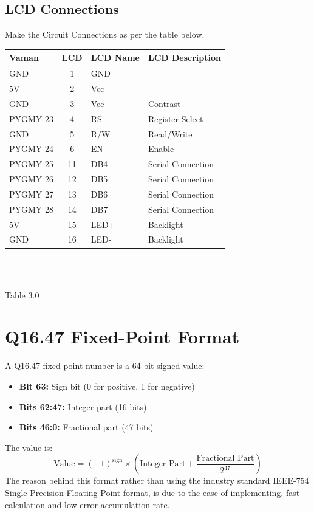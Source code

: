 \documentclass[conference]{IEEEtran}
\begin{document}
\begin{FlushLeft}
\subsection{LCD Connections}
\raggedright
Make the Circuit Connections as per the table below.\\
\vspace{0.25cm}
\centering
    \begin{tabular}{|l|c|l|l|}
        \hline
        \textbf{Vaman} & \textbf{LCD} & \textbf{LCD Name} & \textbf{LCD Description} \\
        \hline
        GND & 1 & GND & \\
        \hline
        5V & 2 & Vcc & \\
        \hline
        GND & 3 & Vee & Contrast \\
        \hline
        PYGMY 23 & 4 & RS & Register Select \\
        \hline
        GND & 5 & R/W & Read/Write \\
        \hline
        PYGMY 24 & 6 & EN & Enable \\
        \hline
        PYGMY 25 & 11 & DB4 & Serial Connection \\
        \hline
        PYGMY 26 & 12 & DB5 & Serial Connection \\
        \hline
        PYGMY 27 & 13 & DB6 & Serial Connection \\
        \hline
        PYGMY 28 & 14 & DB7 & Serial Connection \\
        \hline
        5V & 15 & LED+ & Backlight \\
        \hline
        GND & 16 & LED- & Backlight \\
        \hline
    \end{tabular}
\\
\
\centerline{Table 3.0}



\section{Q16.47 Fixed-Point Format}
A Q16.47 fixed-point number is a 64-bit signed value:
\begin{itemize}
    \item \textbf{Bit 63:} Sign bit (0 for positive, 1 for negative)
    \item \textbf{Bits 62:47:} Integer part (16 bits)
    \item \textbf{Bits 46:0:} Fractional part (47 bits)
\end{itemize}
The value is:
\begin{equation}
    \text{Value} = (-1)^{\text{sign}} \times \left(\text{Integer Part} + \frac{\text{Fractional Part}}{2^{47}}\right)
\end{equation}
The reason behind this format rather than using the industry standard IEEE-754 Single Precision Floating Point format, is due to the ease of implementing, fast calculation and low error accumulation rate. 

\end{FlushLeft}
\end{document}
